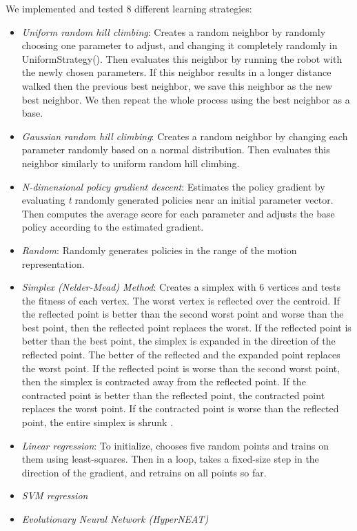 
We implemented and tested 8 different learning strategies:
\begin{itemize}
\item \emph{Uniform random hill climbing}: Creates a random neighbor by
  randomly choosing one parameter to adjust, and changing it completely 
  randomly in UniformStrategy(). Then evaluates this neighbor by running 
  the robot with the newly chosen parameters. If this neighbor results in a
  longer distance walked then the previous best neighbor, we save this
  neighbor as the new best neighbor. We then repeat the whole process
  using the best neighbor as a base.
\item \emph{Gaussian random hill climbing}: Creates a random neighbor by
  changing each parameter randomly based on a normal distribution. Then
  evaluates this neighbor similarly to uniform random hill climbing.
\item \emph{N-dimensional policy gradient descent}: Estimates the policy
  gradient by evaluating \emph{t} randomly generated policies
  near an initial parameter vector. Then computes the average score for
  each parameter and adjusts the base policy according to the estimated
  gradient.
\item \emph{Random}: Randomly generates policies in the range of the motion
representation.
\item \emph{Simplex (Nelder-Mead) Method}: Creates a simplex with 6 vertices and tests the fitness of each vertex. The worst vertex is reflected over the centroid. If the reflected point is better than the second worst point and worse than the best point, then the reflected point replaces the worst. If the reflected point is better than the best point, the simplex is expanded in the direction of the reflected point. The better of the reflected and the expanded point replaces the worst point. If the reflected point is worse than the second worst point, then the simplex is contracted away from the reflected point. If the contracted point is better than the reflected point, the contracted point replaces the worst point. If the contracted point is worse than the reflected point, the entire simplex is shrunk \cite{NMWebsite}.
\item \emph{Linear regression}: To initialize, chooses five random points
and trains on them using least-squares. Then in a loop, takes a fixed-size
step in the direction of the gradient, and retrains on all points so far.
\item \emph{SVM regression}
\item \emph{Evolutionary Neural Network (HyperNEAT)\cite{2}}
\end{itemize}



